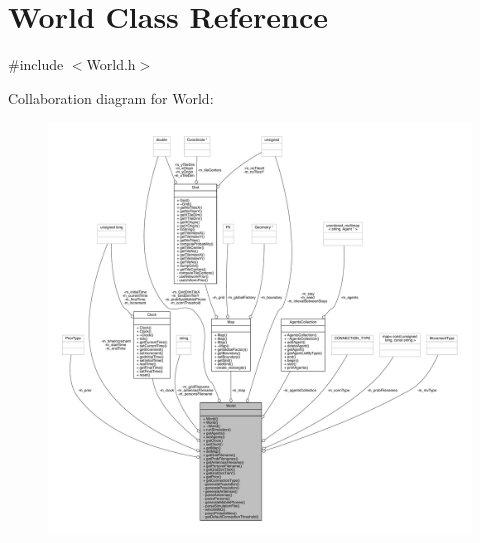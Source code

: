 \hypertarget{class_world}{}\section{World Class Reference}
\label{class_world}


{\ttfamily \#include $<$World.\+h$>$}



Collaboration diagram for World\+:
\nopagebreak
\begin{figure}[H]
\begin{center}
\leavevmode
\includegraphics[width=350pt]{class_world__coll__graph}
\end{center}
\end{figure}

